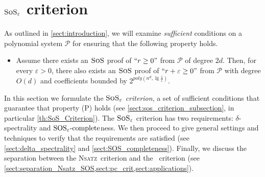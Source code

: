 \documentclass[11pt]{article}
\newcommand{\sos}{\text{\sc{SoS}}}
\newcommand{\Nsatz}{\textsc{Nsatz}}
\newcommand{\1}{\textbf{1}}
\newcommand{\SOSe}{\rm{SOS}_\varepsilon\text{-complete}}
\begin{document}
\section[SoS epsilon criterion]{$\sos_\varepsilon$ criterion}\label{sect:sos-criterion}
As outlined in \cref{sect:introduction}, we will examine \emph{sufficient} conditions on a polynomial system \(\mathcal{P}\) for ensuring that the following property holds.
\begin{itemize}[label=$(\rm{P})$]
    \item \label{prob:1} Assume there exists an $\sos$ proof of $``r \geq 0"$ from $\mathcal{P}$ of degree $2d$. Then, for every $\varepsilon>0$, there also exists an $\sos$ proof of $``r +\varepsilon \geq 0"$ from $\mathcal{P}$ with degree $O(d)$ and coefficients bounded by $2^{poly(n^d,\lg \frac{1}{\varepsilon})}$.
\end{itemize}

In this section we formulate the \emph{$\sos_{\varepsilon}$ criterion}, a set of sufficient conditions that guarantee that property (\textsc{P}) holds (see \cref{sect:sos_criterion_subsection}, in particular \cref{th:SoS_Criterion}). The $\sos_{\varepsilon}$ criterion has two requirements: $\delta$-spectrality and $\SOSe$ness. We then proceed to give general settings and techniques to verify that the requirements are satisfied (see \cref{sect:delta_spectrality} and \cref{sect:SOS_completeness}). Finally, we discuss the separation between the \Nsatz\ criterion and the \sos\ criterion (see \cref{sect:separation_Nsatz_SOS,sect:pc_crit,sect:applications}).
\end{document}
